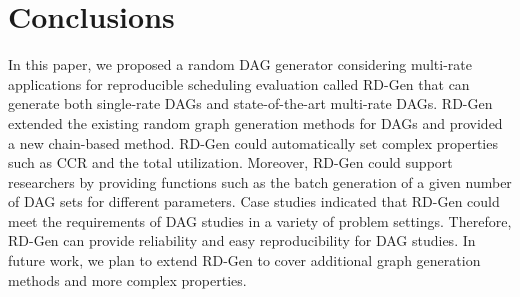 \section{Conclusions}
\label{sec: conclusion}

In this paper, we proposed a random DAG generator considering multi-rate applications for reproducible scheduling evaluation called RD-Gen that can generate both single-rate DAGs and state-of-the-art multi-rate DAGs.
RD-Gen extended the existing random graph generation methods for DAGs and provided a new chain-based method.
RD-Gen could automatically set complex properties such as CCR and the total utilization.
Moreover, RD-Gen could support researchers by providing functions such as the batch generation of a given number of DAG sets for different parameters.
Case studies indicated that RD-Gen could meet the requirements of DAG studies in a variety of problem settings.
Therefore, RD-Gen can provide reliability and easy reproducibility for DAG studies.
In future work, we plan to extend RD-Gen to cover additional graph generation methods and more complex properties.

